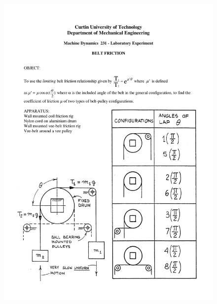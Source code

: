 \begin{figure}[H]
  \includegraphics[width=\linewidth]{lab2/lab2-1}
  \caption*{}
\label{}
\end{figure}
